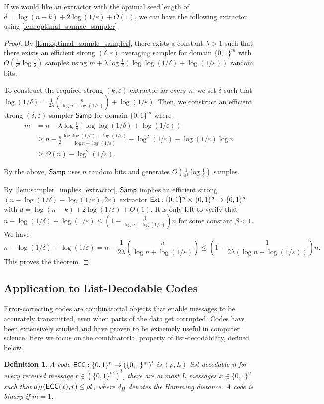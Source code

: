 \documentclass[11pt,letterpaper]{article}
\newtheorem{definition}[theorem]{Definition}
\newcommand{\eps}{\varepsilon}
\newcommand{\1}{\mathbbm{1}}
\newcommand{\zo}{\{0, 1\}}
\newcommand{\Ext}{\textup{\textsf{Ext}}}
\newcommand{\Smp}{\textup{\textsf{Samp}}}
\begin{document}
If we would like an extractor with the optimal seed length of $d = \log(n - k) + 2 \log(1 / \eps) + O(1)$, we can have the following extractor using \cref{lem:optimal_sample_sampler}.
\OurOptimalExtractor*

\begin{proof}
    By \cref{lem:optimal_sample_sampler}, there exists a constant $\lambda > 1$ such that there exists an efficient strong $(\delta, \eps)$ averaging sampler for domain $\zo^m$ with $O(\frac{1}{\eps^2} \log \frac{1}{\delta})$ samples using $m + \lambda\log\frac{1}{\delta}(\log\log(1 / \delta) + \log(1 / \eps))$ random bits.

To construct the required strong $(k, \eps)$ extractor for every $n$, we set $\delta$ such that $\log(1 / \delta) = \frac{1}{2\lambda} (\frac{n}{\log n + \log(1 / \eps)}) + \log(1/\eps)$.
Then, we construct an efficient strong $(\delta, \eps)$ sampler $\Smp$ for domain $\zo^m$ where 
\begin{align*}
     m &= n - \lambda\log\frac{1}{\delta}(\log\log(1 / \delta) + \log(1 / \eps)) \\
     &\ge n - \frac{n}{2}\frac{\log\log(1 / \delta) + \log (1 / \eps)}{\log n + \log(1 / \eps)} - \log^2(1 / \eps) -  \log(1 / \eps)\log n \\
     &\ge \Omega(n) - \log^2(1 / \eps).
\end{align*}
   
 By the above, $\Smp$ uses $n$ random bits and generates $O(\frac{1}{\eps^{2}} \log \frac{1}{\delta})$ samples.

By~\cref{lem:sampler_implies_extractor}, $\Smp$ implies an efficient strong $( n - \log(1 / \delta) + \log (1 / \eps), 2\eps)$ extractor $\Ext: \zo^n \times \zo^d \to \zo^m$ with $d = \log (n-k) + 2 \log (1 / \eps) + O(1)$.
It is only left to verify that $ n - \log(1 / \delta) + \log (1 / \eps) \le (1 -  \frac{\beta}{\log n + \log (1 / \eps)})n$ for some constant $\beta < 1$. 
We have \[
 n - \log(1 / \delta) + \log (1 / \eps) = n - \frac{1}{2\lambda} (\frac{n}{\log n + \log(1 / \eps)}) \le (1 -  \frac{1}{2\lambda(\log n + \log (1 / \eps))})n.
\]
This proves the theorem.
\end{proof}





\subsection{Application to List-Decodable Codes}
Error-correcting codes are combinatorial objects that enable messages to be accurately transmitted, even when parts of the data get corrupted. Codes have been extensively studied and have proven to be extremely useful in computer science. Here we focus on the combinatorial property of list-decodability, defined below.
\begin{definition}
    A code ${\textup{\textsf{ECC}}} : \zo^n \rightarrow ({\zo^m})^t$ is $(\rho, L)$ list-decodable if for every received message $r \in (\zo^m)^t$, there are at most $L$ messages $x \in \zo^n$ such that $d_H({\textup{\textsf{ECC}}}(x),r) \le \rho t$, where $d_H$ denotes the Hamming distance. A code is binary if $m = 1$.
\end{definition}
\end{document}
